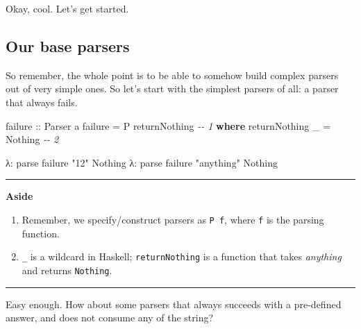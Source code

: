 \documentclass[]{article}
\newenvironment{Shaded}{}{}
\newcommand{\CommentTok}[1]{\textcolor[rgb]{0.38,0.63,0.69}{\textit{#1}}}
\newcommand{\DataTypeTok}[1]{\textcolor[rgb]{0.56,0.13,0.00}{#1}}
\newcommand{\KeywordTok}[1]{\textcolor[rgb]{0.00,0.44,0.13}{\textbf{#1}}}
\newcommand{\NormalTok}[1]{#1}
\newcommand{\OperatorTok}[1]{\textcolor[rgb]{0.40,0.40,0.40}{#1}}
\newcommand{\OtherTok}[1]{\textcolor[rgb]{0.00,0.44,0.13}{#1}}
\newcommand{\StringTok}[1]{\textcolor[rgb]{0.25,0.44,0.63}{#1}}
\begin{document}
Okay, cool. Let's get started.

\subsection{Our base parsers}\label{our-base-parsers}

So remember, the whole point is to be able to somehow build complex parsers out
of very simple ones. So let's start with the simplest parsers of all: a parser
that always fails.

\begin{Shaded}
\begin{Highlighting}[]
\OtherTok{failure ::} \DataTypeTok{Parser}\NormalTok{ a}
\NormalTok{failure }\OtherTok{=} \DataTypeTok{P}\NormalTok{ returnNothing                   }\CommentTok{{-}{-} 1}
    \KeywordTok{where}
\NormalTok{        returnNothing \_ }\OtherTok{=} \DataTypeTok{Nothing}           \CommentTok{{-}{-} 2}
\end{Highlighting}
\end{Shaded}

\begin{Shaded}
\begin{Highlighting}[]
\NormalTok{λ}\OperatorTok{:}\NormalTok{ parse failure }\StringTok{"12"}
\DataTypeTok{Nothing}
\NormalTok{λ}\OperatorTok{:}\NormalTok{ parse failure }\StringTok{"anything"}
\DataTypeTok{Nothing}
\end{Highlighting}
\end{Shaded}

\begin{center}\rule{0.5\linewidth}{0.5pt}\end{center}

\textbf{Aside}

\begin{enumerate}
\def\labelenumi{\arabic{enumi}.}
\tightlist
\item
  Remember, we specify/construct parsers as \texttt{P\ f}, where \texttt{f} is
  the parsing function.
\item
  \texttt{\_} is a wildcard in Haskell; \texttt{returnNothing} is a function
  that takes \emph{anything} and returns \texttt{Nothing}.
\end{enumerate}

\begin{center}\rule{0.5\linewidth}{0.5pt}\end{center}

Easy enough. How about some parsers that always succeeds with a pre-defined
answer, and does not consume any of the string?
\end{document}
